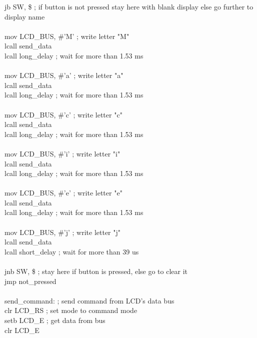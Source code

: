 \documentclass{article}
\begin{document}
    jb      SW, \$               ; if button is not pressed stay here with blank display else go further to display name\\
    \\
    mov     LCD\_BUS, \#'M'       ; write letter "M"\\
    lcall   send\_data\\
    lcall   long\_delay          ; wait for more than 1.53 ms\\
\\
    mov     LCD\_BUS, \#'a'       ; write letter "a"\\
    lcall   send\_data\\
    lcall   long\_delay          ; wait for more than 1.53 ms\\
\\
    mov     LCD\_BUS, \#'c'       ; write letter "c"\\
    lcall   send\_data\\
    lcall   long\_delay          ; wait for more than 1.53 ms\\
\\
    mov     LCD\_BUS, \#'i'       ; write letter "i"\\
    lcall   send\_data\\
    lcall   long\_delay          ; wait for more than 1.53 ms\\
\\
    mov     LCD\_BUS, \#'e'       ; write letter "e"\\
    lcall   send\_data\\
    lcall   long\_delay          ; wait for more than 1.53 ms\\
\\
    mov     LCD\_BUS, \#'j'       ; write letter "j"\\
    lcall   send\_data\\
    lcall   short\_delay         ; wait for more than 39 us\\
\\
    jnb     SW, \$               ; stay here if button is pressed, else go to clear it\\
    jmp     not\_pressed\\
\\
send\_command:       ; send command from LCD's data bus\\
    clr     LCD\_RS  ; set mode to command mode\\
    setb    LCD\_E   ; get data from bus\\
    clr     LCD\_E\\
\end{document}
